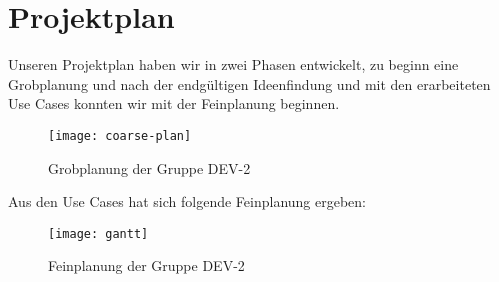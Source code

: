 \chapter{Projektplan}

Unseren Projektplan haben wir in zwei Phasen entwickelt, zu beginn eine Grobplanung und nach der endgültigen Ideenfindung und mit den erarbeiteten Use Cases konnten wir mit der Feinplanung beginnen. 

\begin{figure}[H]
	\centering
	\texttt{[image: coarse-plan]}
    \caption{Grobplanung der Gruppe DEV-2\cite{coarsePlan2022}}
	\label{fig:coarse-plan}
\end{figure}

Aus den Use Cases hat sich folgende Feinplanung ergeben:



\begin{landscape}
    \begin{figure}[H]
        \centering
        \texttt{[image: gantt]}
        \caption{Feinplanung der Gruppe DEV-2\cite{finePlan2022}}
        \label{fig:fine-plan}
    \end{figure}
\end{landscape}